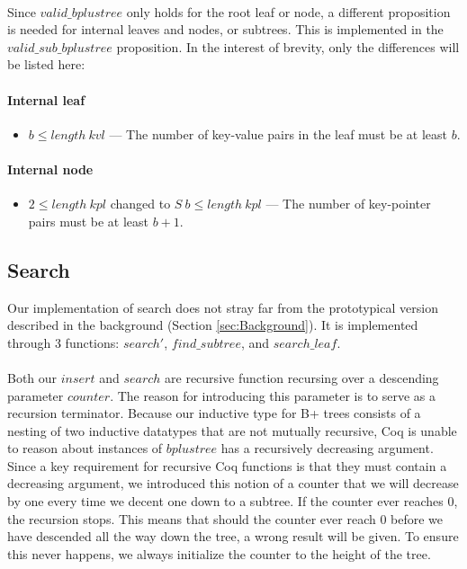 \paragraph{}
Since $valid\_bplustree$ only holds for the root leaf or node, a different proposition is needed for internal leaves and nodes, or subtrees. This is implemented in the $valid\_sub\_bplustree$ proposition. In the interest of brevity, only the differences will be listed here:

\paragraph{Internal leaf}
\begin{itemize}
\item $b \leq length\ kvl$ --- The number of key-value pairs in the leaf must be at least $b$.
\end{itemize}

\paragraph{Internal node}
\begin{itemize}
\item $2 \leq length\ kpl$ changed to $S\ b \leq length\ kpl$ --- The number of key-pointer pairs must be at least $b+1$.
\end{itemize}


\subsection{Search}
\label{subsec:search}
Our implementation of search does not stray far from the prototypical version described in the background (Section \ref{sec:Background}). It is implemented through 3 functions: $search'$, $find\_subtree$, and $search\_leaf$. 

\paragraph{}
Both our $insert$ and $search$ are recursive function recursing over a descending parameter $counter$. The reason for introducing this parameter is to serve as a recursion terminator. Because our inductive type for B+ trees consists of a nesting of two inductive datatypes that are not mutually recursive, Coq is unable to reason about instances of $bplustree$ has a recursively decreasing argument. Since a key requirement for recursive Coq functions is that they must contain a decreasing argument, we introduced this notion of a counter that we will decrease by one every time we decent one down to a subtree. If the counter ever reaches $0$, the recursion stops. This means that should the counter ever reach $0$ before we have descended all the way down the tree, a wrong result will be given. To ensure this never happens, we always initialize the counter to the height of the tree.

